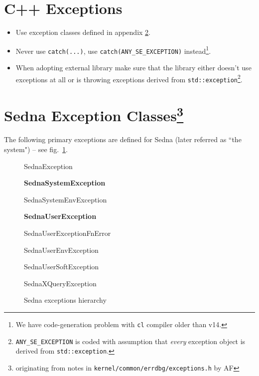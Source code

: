 \documentclass{article}
\begin{document}
\section{C{\small ++} Exceptions}

\begin{itemize}
\item Use exception classes defined in appendix \ref{sec:exnclasses}.
\item Never use \verb|catch(...)|, use \verb|catch(ANY_SE_EXCEPTION)| instead\footnote{We have code-generation problem with \texttt{cl} compiler older than v14.}.
\item When adopting external library make sure that the library either doesn't use exceptions at all or is throwing exceptions derived from \texttt{std::exception}\footnote{\texttt{ANY\_SE\_EXCEPTION} is coded with assumption that \emph{every} exception object is derived from \texttt{std::exception}.}.
\end{itemize}

\newpage
\appendix
\section[Sedna Exception Classes]{Sedna Exception Classes\footnote{originating from notes in \texttt{kernel/common/errdbg/exceptions.h} by AF}}
\label{sec:exnclasses}

The following primary exceptions are defined for Sedna (later referred as 
``the system") -- see fig.~\ref{fig:exceptions}.

\begin{figure}[ht]
\centering
\begin{boxedminipage}{4in}
{\Large SednaException}
	\begin{list}{\ArrowBoldDownRight}{}
	\item\textbf{SednaSystemException}
		\smallskip
		\begin{list}{\ArrowBoldRightStrobe}{}
		\item SednaSystemEnvException
		\end{list}
		\smallskip
	\item\textbf{SednaUserException}
		\smallskip
		\begin{list}{\ArrowBoldRightStrobe}{}
		\item SednaUserExceptionFnError
		\item SednaUserEnvException
		\item SednaUserSoftException
		\item SednaXQueryException
		\end{list}
	\end{list}
\end{boxedminipage}
\caption{Sedna exceptions hierarchy}
\label{fig:exceptions}
\end{figure}
\end{document}

